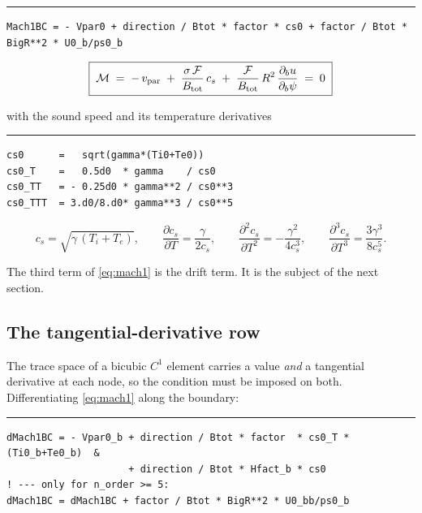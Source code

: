 \documentclass[11pt,a4paper]{article}
\newenvironment{codeline}[1]
  {\par\medskip\noindent\textcolor{coderule}{\rule{\linewidth}{0.4pt}}\par
   \nopagebreak\noindent{\ttfamily\footnotesize\textcolor{keyc}{#1}}\par\nopagebreak\smallskip}
  {\par\medskip}
\begin{document}
\begin{codeline}{mod\_boundary\_conditions.f90:617 \quad\normalfont\itshape(the line this note is about)}
\begin{lstlisting}
Mach1BC = - Vpar0 + direction / Btot * factor * cs0 + factor / Btot * BigR**2 * U0_b/ps0_b
\end{lstlisting}
\end{codeline}

\begin{equation}
  \boxed{\;
  \mathcal{M} \;=\; -\,v_{\rm par}
  \;+\; \frac{\sigma\,\mathcal{F}}{B_{\rm tot}}\,c_s
  \;+\; \frac{\mathcal{F}}{B_{\rm tot}}\,R^{2}\,\frac{\partial_b u}{\partial_b \psi}
  \;=\; 0
  \;}
  \label{eq:mach1}
\end{equation}

with the sound speed and its temperature derivatives

\begin{codeline}{mod\_boundary\_conditions.f90:612--615}
\begin{lstlisting}
cs0      =   sqrt(gamma*(Ti0+Te0))
cs0_T    =   0.5d0  * gamma    / cs0
cs0_TT   = - 0.25d0 * gamma**2 / cs0**3
cs0_TTT  = 3.d0/8.d0* gamma**3 / cs0**5
\end{lstlisting}
\end{codeline}

\begin{equation}
  c_s = \sqrt{\gamma\,(T_i + T_e)},\qquad
  \frac{\partial c_s}{\partial T} = \frac{\gamma}{2c_s},\qquad
  \frac{\partial^2 c_s}{\partial T^2} = -\frac{\gamma^2}{4c_s^3},\qquad
  \frac{\partial^3 c_s}{\partial T^3} = \frac{3\gamma^3}{8c_s^5}.
\end{equation}

The third term of \eqref{eq:mach1} is the drift term.  It is the subject of the next section.

\subsection{The tangential-derivative row}

The trace space of a bicubic $C^1$ element carries a value \emph{and} a tangential derivative
at each node, so the condition must be imposed on both.  Differentiating \eqref{eq:mach1}
along the boundary:

\begin{codeline}{mod\_boundary\_conditions.f90:621--622, 655}
\begin{lstlisting}
dMach1BC = - Vpar0_b + direction / Btot * factor  * cs0_T * (Ti0_b+Te0_b)  &
                     + direction / Btot * Hfact_b * cs0
! --- only for n_order >= 5:
dMach1BC = dMach1BC + factor / Btot * BigR**2 * U0_bb/ps0_b
\end{lstlisting}
\end{codeline}
\end{document}
